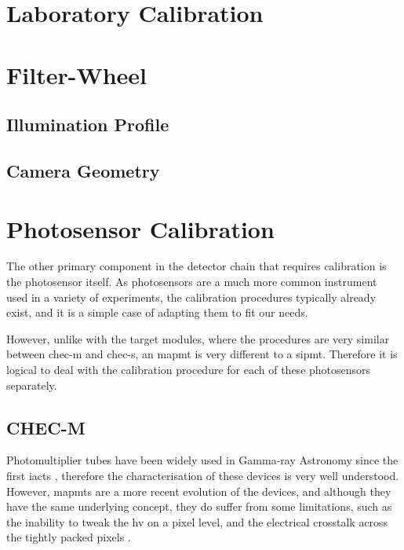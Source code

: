 
\section{Laboratory Calibration}


\section{Filter-Wheel}

\subsection{Illumination Profile}

\subsection{Camera Geometry}

\section{Photosensor Calibration}

The other primary component in the detector chain that requires calibration is the photosensor itself. As photosensors are a much more common instrument used in a variety of experiments, the calibration procedures typically already exist, and it is a simple case of adapting them to fit our needs.

However, unlike with the \gls{target} modules, where the procedures are very similar between \gls{chec-m} and \gls{chec-s}, an \gls{mapmt} is very different to a \gls{sipmt}. Therefore it is logical to deal with the calibration procedure for each of these photosensors separately.

\subsection{CHEC-M}

Photomultiplier tubes have been widely used in Gamma-ray Astronomy since the first \glspl{iact} , therefore the characterisation of these devices is very well understood. However, \glspl{mapmt} are a more recent evolution of the devices, and although they have the same underlying concept, they do suffer from some limitations, such as the inability to tweak the \gls{hv} on a pixel level, and the electrical crosstalk across the tightly packed pixels .

